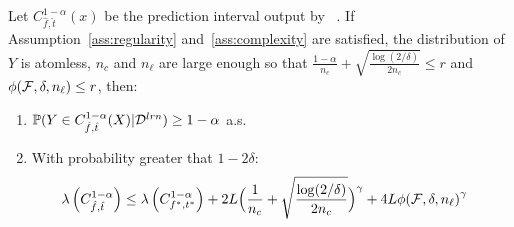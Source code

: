\begin{theorem}
    \label{thme:main-constant}
    Let $C_{\hat{f},\hat{t}}^{1-\alpha}(x)$ %
    be the prediction interval output by \method~. If Assumption~\ref{ass:regularity} and~\ref{ass:complexity} are satisfied, the distribution of $Y$ is atomless, $n_c$ and $n_\ell$ are large enough so that $\frac{1-\alpha}{n_c} + \sqrt{\frac{\log(2/\delta)}{2n_c}} \leq r$ and ${\phi(\mathcal{F},\delta,n_\ell)}\leq r$, then:
    \vspace{-0.2cm}
    \begin{enumerate}[leftmargin=*]
        \item ${\mathbb{P}}(Y\in C_{\hat{f},\hat{t}}^{1-\alpha}(X)|{\cal D}^{lrn})\geq 1-\alpha$ a.s. %
        \item With probability greater that $1-2\delta$:
        \begin{align}
            \label{eq:thme-const}
            &\lambda\left(C_{\hat{f},\hat{t}}^{1-\alpha}\right)\leq \lambda\left(C_{f^*,t^*}^{1-\alpha}\right) + 2L\Big(\frac{1}{n_{c}} +\sqrt{\frac{\log(2/\delta)}{2n_{c}}}\Big)^{\gamma} + 4L\phiFl^\gamma %
        \end{align}
    \end{enumerate}
\end{theorem}


